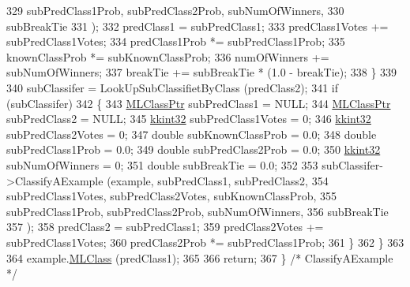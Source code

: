 \begin{DoxyCode}
329                                     subPredClass1Prob,  subPredClass2Prob,  subNumOfWinners,
330                                     subBreakTie
331                                    );
332       predClass1 = subPredClass1;
333       predClass1Votes += subPredClass1Votes;
334       predClass1Prob  *= subPredClass1Prob;
335       knownClassProb  *= subKnownClassProb;
336       numOfWinners    += subNumOfWinners;
337       breakTie        += subBreakTie * (1.0 - breakTie);
338     \}
339 
340     subClassifer = LookUpSubClassifietByClass (predClass2);
341     \textcolor{keywordflow}{if}  (subClassifer)
342     \{
343       \hyperlink{class_k_k_m_l_l_1_1_m_l_class}{MLClassPtr}       subPredClass1      = NULL;
344       \hyperlink{class_k_k_m_l_l_1_1_m_l_class}{MLClassPtr}       subPredClass2      = NULL;
345       \hyperlink{namespace_k_k_b_a8fa4952cc84fda1de4bec1fbdd8d5b1b}{kkint32}          subPredClass1Votes = 0;
346       \hyperlink{namespace_k_k_b_a8fa4952cc84fda1de4bec1fbdd8d5b1b}{kkint32}          subPredClass2Votes = 0;
347       \textcolor{keywordtype}{double}           subKnownClassProb  = 0.0;
348       \textcolor{keywordtype}{double}           subPredClass1Prob  = 0.0;
349       \textcolor{keywordtype}{double}           subPredClass2Prob  = 0.0;
350       \hyperlink{namespace_k_k_b_a8fa4952cc84fda1de4bec1fbdd8d5b1b}{kkint32}          subNumOfWinners    = 0;
351       \textcolor{keywordtype}{double}           subBreakTie        = 0.0;
352 
353       subClassifer->ClassifyAExample (example, subPredClass1, subPredClass2, 
354                                     subPredClass1Votes, subPredClass2Votes, subKnownClassProb,
355                                     subPredClass1Prob,  subPredClass2Prob,  subNumOfWinners,
356                                     subBreakTie        
357                                    );
358       predClass2 = subPredClass1;
359       predClass2Votes += subPredClass1Votes;
360       predClass2Prob  *= subPredClass1Prob;
361     \}
362   \}
363 
364   example.\hyperlink{class_k_k_m_l_l_1_1_feature_vector_a3c8fe002c6e868f8c00059c004fb32fd}{MLClass} (predClass1);
365 
366   \textcolor{keywordflow}{return};
367 \}  \textcolor{comment}{/* ClassifyAExample */}
\end{DoxyCode}
